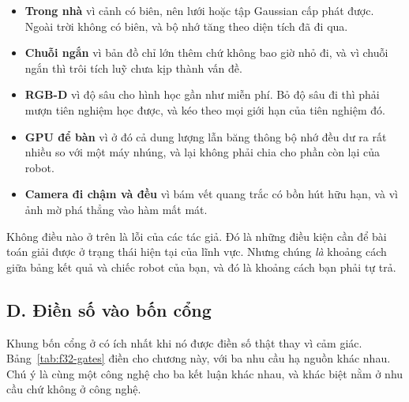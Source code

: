 \documentclass[../../deep_learning.tex]{subfiles}
\begin{document}
\begin{itemize}
\item \textbf{Trong nhà} vì cảnh có biên, nên lưới hoặc tập Gaussian cấp phát được. Ngoài trời không có biên, và bộ nhớ tăng theo diện tích đã đi qua.
\item \textbf{Chuỗi ngắn} vì bản đồ chỉ lớn thêm chứ không bao giờ nhỏ đi, và vì chuỗi ngắn thì trôi tích luỹ chưa kịp thành vấn đề.
\item \textbf{RGB-D} vì độ sâu cho hình học gần như miễn phí. Bỏ độ sâu đi thì phải mượn tiên nghiệm học được, và kéo theo mọi giới hạn của tiên nghiệm đó.
\item \textbf{GPU để bàn} vì ở đó cả dung lượng lẫn băng thông bộ nhớ đều dư ra rất nhiều so với một máy nhúng, và lại không phải chia cho phần còn lại của robot.
\item \textbf{Camera đi chậm và đều} vì bám vết quang trắc có bồn hút hữu hạn, và vì ảnh mờ phá thẳng vào hàm mất mát.
\end{itemize}

Không điều nào ở trên là lỗi của các tác giả. Đó là những điều kiện cần để bài toán giải được ở trạng thái hiện tại của lĩnh vực. Nhưng chúng \emph{là} khoảng cách giữa bảng kết quả và chiếc robot của bạn, và đó là khoảng cách bạn phải tự trả.

\subsection{D. Điền số vào bốn cổng}
Khung bốn cổng ở  có ích nhất khi nó được điền số thật thay vì cảm giác. Bảng~\ref{tab:f32-gates} điền cho chương này, với ba nhu cầu hạ nguồn khác nhau. Chú ý là cùng một công nghệ cho ba kết luận khác nhau, và khác biệt nằm ở nhu cầu chứ không ở công nghệ.
\end{document}

